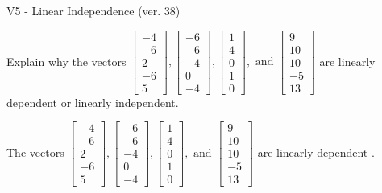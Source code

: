 \begin{exercise}
  \begin{exerciseTitle}V5 - Linear Independence (ver. 38)\end{exerciseTitle}
  \begin{exerciseStatement}
    Explain why the vectors \(\left[\begin{array}{r}
-4 \\
-6 \\
2 \\
-6 \\
5
\end{array}\right] , \left[\begin{array}{r}
-6 \\
-6 \\
-4 \\
0 \\
-4
\end{array}\right] , \left[\begin{array}{r}
1 \\
4 \\
0 \\
1 \\
0
\end{array}\right] , \text{ and } \left[\begin{array}{r}
9 \\
10 \\
10 \\
-5 \\
13
\end{array}\right]\) are linearly dependent or linearly independent.	


  \end{exerciseStatement}
  \begin{exerciseAnswer}
   The vectors \(\left[\begin{array}{r}
-4 \\
-6 \\
2 \\
-6 \\
5
\end{array}\right] , \left[\begin{array}{r}
-6 \\
-6 \\
-4 \\
0 \\
-4
\end{array}\right] , \left[\begin{array}{r}
1 \\
4 \\
0 \\
1 \\
0
\end{array}\right] , \text{ and } \left[\begin{array}{r}
9 \\
10 \\
10 \\
-5 \\
13
\end{array}\right]\) are 
  	 linearly dependent  .
  


  \end{exerciseAnswer}
\end{exercise}
